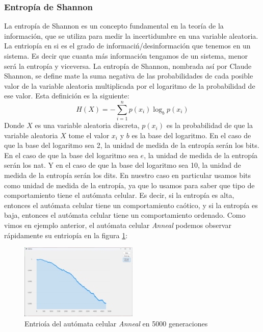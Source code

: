 \subsubsection{Entrop\'ia de Shannon}
\label{sec:Entriopia}
    La entrop\'ia de Shannon es un concepto fundamental en la teor\'ia de la informaci\'on, 
        que se utiliza para medir la incertidumbre en una variable aleatoria. La entriop\'ia en si 
        es el grado de informaci\'n/desinformaci\'on que tenemos en un sistema. Es decir que cuanta m\'as
        informaci\'on tengamos de un sistema, menor ser\'a la entrop\'ia y viceversa. La entrop\'ia de Shannon, 
        nombrada as\'i por Claude Shannon\cite{Shannon1948}, se define mate la suma negativa de las probabilidades de cada
        posible valor de la variable aleatoria multiplicada por el logaritmo de la probabilidad de ese valor. Esta
        definici\'on es la siguiente:
        \begin{equation}
            H(X) = -\sum_{i=1}^{n} p(x_i) \log_b p(x_i)
        \end{equation}
    \vskip 0.5cm
    Donde $X$ es una variable aleatoria discreta, $p(x_i)$ es la probabilidad de que la variable aleatoria 
        $X$ tome el valor $x_i$ y $b$ es la base del logaritmo. En el caso de que la base del logaritmo sea 2, 
        la unidad de medida de la entrop\'ia ser\'an los bits. En el caso de que la base del logaritmo sea $e$,
        la unidad de medida de la entrop\'ia ser\'an los nat. Y en el caso de que la base del logaritmo sea 10, 
        la unidad de medida de la entrop\'ia ser\'an los dits.
    \vskip 0.5cm
    En nuestro caso en particular usamos bits como unidad de medida de la entrop\'ia, ya que lo usamos para saber que tipo de comportamiento
        tiene el aut\'omata celular. Es decir, si la entrop\'ia es alta, entonces el aut\'omata celular tiene un comportamiento ca\'otico, y si 
        la entrop\'ia es baja, entonces el aut\'omata celular tiene un comportamiento ordenado.
    \vskip 0.5cm
    Como vimos en ejemplo anterior, el aut\'omata celular \textit{Anneal} podemos observar r\'apidamente su entriop\'ia
        en la figura \ref{fig:annealEntropia}: 
        \begin{figure}[h]
            \centering
            \includegraphics[width=0.5\textwidth]{./images/marco_teorico/automatas_celulares/Anneal5kShann.png}
            \caption{Entrio\'ia del aut\'omata celular \textit{Anneal} en 5000 generaciones}
            \label{fig:annealEntropia}  
        \end{figure}